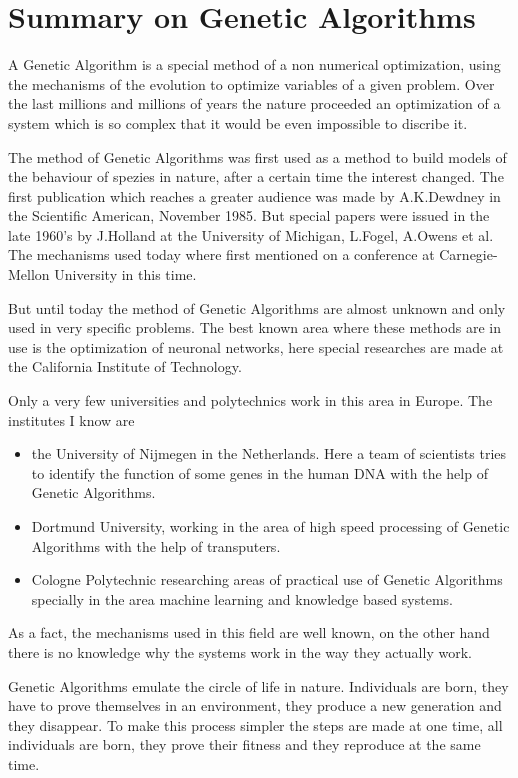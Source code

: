 \section{Summary on Genetic Algorithms}
A Genetic Algorithm is a special method of a non numerical optimization, using
the mechanisms of the evolution to optimize variables of a given problem. Over
the last millions and millions of years the nature proceeded an optimization
of a system which is so complex that it would be even impossible to discribe it.

The method of Genetic Algorithms was first used as a method to build models of
the behaviour of spezies in nature, after a certain time the interest changed.
The first publication which reaches a greater audience was made by A.K.Dewdney
in the Scientific American, November 1985. But special papers were issued in
the late 1960's by J.Holland at the University of Michigan, L.Fogel, A.Owens
et al. The mechanisms used today where first mentioned on a conference at Carnegie-
Mellon University in this time.

But until today the method of Genetic Algorithms are almost unknown and only used
in very specific problems. The best known area where these methods are in use
is the optimization of neuronal networks, here special researches are made at
the California Institute of Technology.

Only a very few universities and polytechnics work in this area in Europe. The
institutes I know are
\begin{itemize}
  \item the University of Nijmegen in the Netherlands. Here a team of scientists
tries to identify the function of some genes in the human DNA with the help of
Genetic Algorithms.
  \item Dortmund University, working in the area of high speed processing of
Genetic Algorithms with the help of transputers.
  \item Cologne Polytechnic researching areas of practical use of Genetic Algorithms
specially in the area machine learning and knowledge based systems.
\end{itemize}
As a fact, the mechanisms used in this field are well known, on the other hand
there is no knowledge why the systems work in the way they actually work.

Genetic Algorithms emulate the circle of life in nature. Individuals are born,
they have to prove themselves in an environment, they produce a new generation
and they disappear. To make this process simpler the steps are made at one time,
all individuals are born, they prove their fitness and they reproduce at the
same time.

